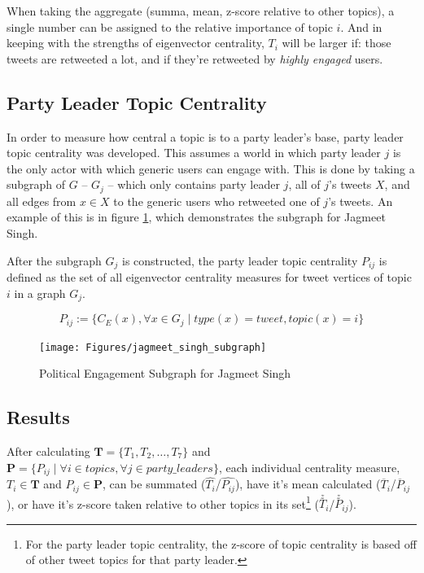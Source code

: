 When taking the aggregate (summa, mean, z-score relative to other topics), a
single number can be assigned to the relative importance of topic $i$. And in
keeping with the strengths of eigenvector centrality, $T_{i}$ will be larger if:
those tweets are retweeted a lot, and if they're retweeted by \emph{highly
engaged} users.

\subsection{Party Leader Topic Centrality}\label{sec:LeaderCentrality}

In order to measure how central a topic is to a party leader's base, party
leader topic centrality was developed. This assumes a world in which party
leader $j$ is the only actor with which generic users can engage with. This is
done by taking a subgraph of $G$ -- $G_{j}$ -- which only contains party leader
$j$, all of $j$'s tweets $X$, and all edges from $x\in X$ to the generic users
who retweeted one of $j$'s tweets. An example of this is in figure
\ref{fig:jagmeet_singh_subgraph}, which demonstrates the subgraph for Jagmeet
Singh. 

After the subgraph $G_j$ is constructed, the party leader topic
centrality $P_{ij}$ is defined as the set of all eigenvector centrality measures
for tweet vertices of topic $i$ in a graph $G_{j}$.

\begin{equation}
    P_{ij} := \{ C_{E}(x) ,  \forall x \in G_{j} \mid type(x)=tweet, topic(x)=i \}
\end{equation}

\begin{singlespacing}
    \begin{figure}[H]
    \centering
    \texttt{[image: Figures/jagmeet\_singh\_subgraph]}
    \caption[Political Engagement Subgraph for Jagmeet Singh]{Political Engagement Subgraph for Jagmeet Singh}
    \label{fig:jagmeet_singh_subgraph}
    \end{figure}
\end{singlespacing}

\subsection{Results}\label{sec:TopicCentralityResults}

After calculating $\textbf{T}=\{T_{1},T_{2},\dots,T_{7}\}$ and
$\textbf{P}=\{P_{ij} \mid \forall i \in topics,\forall j \in party\_leaders \}$,
each individual centrality measure, $T_{i} \in \textbf{T}$ and $P_{ij}\in
\textbf{P}$, can be summated ($\hat{T_{i}}$/$\hat{P_{ij}}$), have it's mean
calculated ($\overline{T}_{i}$/$\overline{P}_{ij}$), or have it's z-score taken
relative to other topics in its set\footnote{For the party leader topic
centrality, the z-score of topic centrality is based off of other tweet topics for that
party leader.} ($\stackrel{z}{T}_{i}$/$\stackrel{z}{P}_{ij}$).

